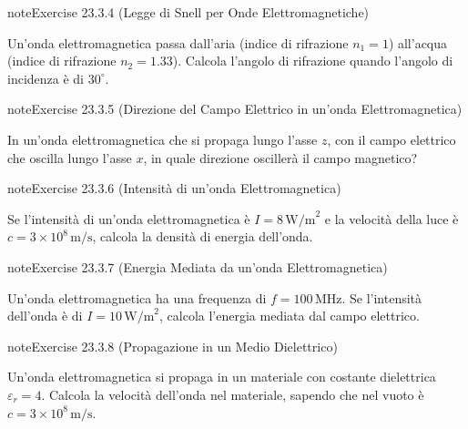 \documentclass[letterpaper,10pt,italian]{jupyterBook}
\begin{document}
\begin{sphinxadmonition}{note}{Exercise 23.3.4 (Legge di Snell per Onde Elettromagnetiche)}



\sphinxAtStartPar
Un’onda elettromagnetica passa dall’aria (indice di rifrazione \(n_1 = 1\)) all’acqua (indice di rifrazione \(n_2 = 1.33\)). Calcola l’angolo di rifrazione quando l’angolo di incidenza è di \(30^\circ\).
\end{sphinxadmonition}
 \label{exercise:ch/electromagnetism/em-waves-problems-exercise-4}

\begin{sphinxadmonition}{note}{Exercise 23.3.5 (Direzione del Campo Elettrico in un’onda Elettromagnetica)}



\sphinxAtStartPar
In un’onda elettromagnetica che si propaga lungo l’asse \(z\), con il campo elettrico che oscilla lungo l’asse \(x\), in quale direzione oscillerà il campo magnetico?
\end{sphinxadmonition}
 \label{exercise:ch/electromagnetism/em-waves-problems-exercise-5}

\begin{sphinxadmonition}{note}{Exercise 23.3.6 (Intensità di un’onda Elettromagnetica)}



\sphinxAtStartPar
Se l’intensità di un’onda elettromagnetica è \(I = 8 \, \text{W/m}^2\) e la velocità della luce è \(c = 3 \times 10^8 \, \text{m/s}\), calcola la densità di energia dell’onda.
\end{sphinxadmonition}
 \label{exercise:ch/electromagnetism/em-waves-problems-exercise-6}

\begin{sphinxadmonition}{note}{Exercise 23.3.7 (Energia Mediata da un’onda Elettromagnetica)}



\sphinxAtStartPar
Un’onda elettromagnetica ha una frequenza di \(f = 100 \, \text{MHz}\). Se l’intensità dell’onda è di \(I = 10 \, \text{W/m}^2\), calcola l’energia mediata dal campo elettrico.
\end{sphinxadmonition}
 \label{exercise:ch/electromagnetism/em-waves-problems-exercise-7}

\begin{sphinxadmonition}{note}{Exercise 23.3.8 (Propagazione in un Medio Dielettrico)}



\sphinxAtStartPar
Un’onda elettromagnetica si propaga in un materiale con costante dielettrica \(\varepsilon_r = 4\). Calcola la velocità dell’onda nel materiale, sapendo che nel vuoto è \(c = 3 \times 10^8 \, \text{m/s}\).
\end{sphinxadmonition}
 \label{exercise:ch/electromagnetism/em-waves-problems-exercise-8}
\end{document}
